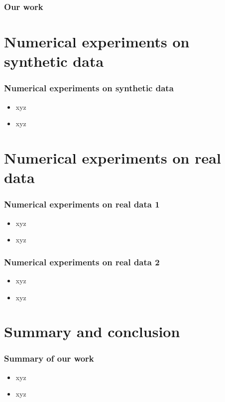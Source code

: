 \documentclass{beamer}
\begin{document}
\begin{frame}
     \frametitle{ Our work}
\end{frame}



\section{Numerical experiments on synthetic data}  \label{sec:NumExpSyn}

\begin{frame}
\frametitle{Numerical experiments on synthetic data}
\begin{itemize}
\item xyz
\item xyz
\end{itemize}
\end{frame}


\section{Numerical experiments on real data}   \label{sec:NumExpReal}

\begin{frame}
\frametitle{Numerical experiments on real data 1}
\begin{itemize}
\item xyz
\item xyz
\end{itemize}
\end{frame}

\begin{frame}
\frametitle{Numerical experiments on real data 2}
\begin{itemize}
\item xyz
\item xyz
\end{itemize}
\end{frame}




\section{Summary and conclusion}  \label{sec:conclusion}

\begin{frame}
\frametitle{Summary of our work}
\begin{itemize}
\item xyz
\item xyz
\end{itemize}
\end{frame}
\end{document}
